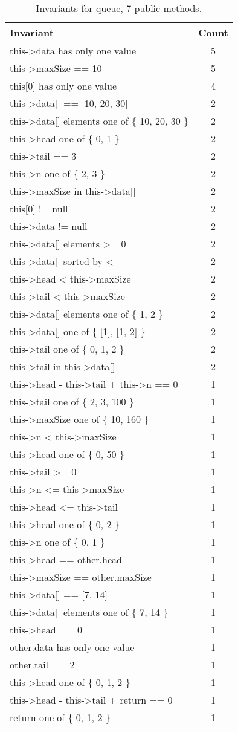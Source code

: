 \begin{table}[ht]
\centering
\scriptsize
\caption{Invariants for queue, 7 public methods.}
\label{queue_daikon}
\begin{tabular}{|l|c|}
\hline
Invariant & Count \\
\hline
this->data has only one value & 5 \\
this->maxSize == 10 & 5 \\
this[0] has only one value & 4 \\
this->data[] == [10, 20, 30] & 2 \\
this->data[] elements one of \{ 10, 20, 30 \} & 2 \\
this->head one of \{ 0, 1 \} & 2 \\
this->tail == 3 & 2 \\
this->n one of \{ 2, 3 \} & 2 \\
this->maxSize in this->data[] & 2 \\
this[0] != null & 2 \\
this->data != null & 2 \\
this->data[] elements >= 0 & 2 \\
this->data[] sorted by < & 2 \\
this->head < this->maxSize & 2 \\
this->tail < this->maxSize & 2 \\
this->data[] elements one of \{ 1, 2 \} & 2 \\
this->data[] one of \{ [1], [1, 2] \} & 2 \\
this->tail one of \{ 0, 1, 2 \} & 2 \\
this->tail in this->data[] & 2 \\
this->head - this->tail + this->n == 0 & 1 \\
this->tail one of \{ 2, 3, 100 \} & 1 \\
this->maxSize one of \{ 10, 160 \} & 1 \\
this->n < this->maxSize & 1 \\
this->head one of \{ 0, 50 \} & 1 \\
this->tail >= 0 & 1 \\
this->n <= this->maxSize & 1 \\
this->head <= this->tail & 1 \\
this->head one of \{ 0, 2 \} & 1 \\
this->n one of \{ 0, 1 \} & 1 \\
this->head == other.head & 1 \\
this->maxSize == other.maxSize & 1 \\
this->data[] == [7, 14] & 1 \\
this->data[] elements one of \{ 7, 14 \} & 1 \\
this->head == 0 & 1 \\
other.data has only one value & 1 \\
other.tail == 2 & 1 \\
this->head one of \{ 0, 1, 2 \} & 1 \\
this->head - this->tail + return == 0 & 1 \\
return one of \{ 0, 1, 2 \} & 1 \\
\hline
\end{tabular}
\end{table}

